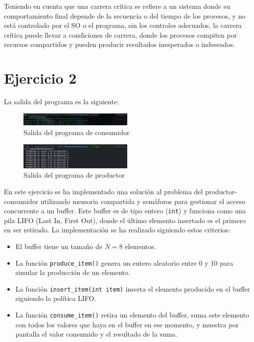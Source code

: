 \documentclass[twocolumn]{article}
\begin{document}
Teniendo en cuenta que una carrera crítica se refiere a un sistema donde su comportamiento final depende de la secuencia o del tiempo de los procesos, y no está controlado por el SO o el programa, sin los controles adecuados, la carrera crítica puede llevar a condiciones de carrera, donde los procesos compiten por recursos compartidos y pueden producir resultados inesperados o indeseados.

\section{Ejercicio 2}

La salida del programa es la siguiente:

\begin{figure}[H]
    \centering
    \includegraphics[width=0.5\textwidth]{ejercicio2/consumidor.jpg}
    \caption{Salida del programa de consumidor} 
    \label{fig:my_label}
\end{figure}

\begin{figure}[H]
    \centering
    \includegraphics[width=0.5\textwidth]{ejercicio2/productor.jpg}
    \caption{Salida del programa de productor} 
    \label{fig:my_label}
\end{figure}


En este ejercicio se ha implementado una solución al problema del productor-consumidor utilizando memoria compartida y semáforos para gestionar el acceso concurrente a un buffer. Este buffer es de tipo entero (\texttt{int}) y funciona como una pila LIFO (Last In, First Out), donde el último elemento insertado es el primero en ser retirado. La implementación se ha realizado siguiendo estos criterios:

\begin{itemize}
    \item El buffer tiene un tamaño de $N=8$ elementos.
    \item La función \texttt{produce\_item()} genera un entero aleatorio entre 0 y 10 para simular la producción de un elemento.
    \item La función \texttt{insert\_item(int item)} inserta el elemento producido en el buffer siguiendo la política LIFO.
    \item La función \texttt{consume\_item()} retira un elemento del buffer, suma este elemento con todos los valores que haya en el buffer en ese momento, y muestra por pantalla el valor consumido y el resultado de la suma.
\end{itemize}
\end{document}
